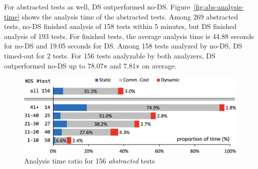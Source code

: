 For abstracted tests as well, DS outperformed no-DS.
Figure~\ref{fig:abs-analysis-time} shows the analysis time of the abstracted tests.
Among 269 abstracted tests, no-DS finished analysis of 158 tests within 5 minutes,
but DS finished analysis of 193 tests.  For finished tests, the average analysis
time is 44.88 seconds for no-DS and 19.05 seconds for DS. Among 158 tests analyzed by no-DS, DS
timed-out for 2 tests.  For 156 tests analyzable by both analyzers,
DS outperformed no-DS up to 78.07${\textsf{x}}$ and 7.81${\textsf{x}}$ on average.

\begin{figure}[t]
  \centering
  \includegraphics[width=\linewidth]{img/abs-analysis-ratio}
  \vspace*{-1.5em}
  \caption{Analysis time ratio for 156 \textit{abstracted} tests}
  \label{fig:abs-analysis-ratio}
  \vspace*{-1.5em}
\end{figure}

